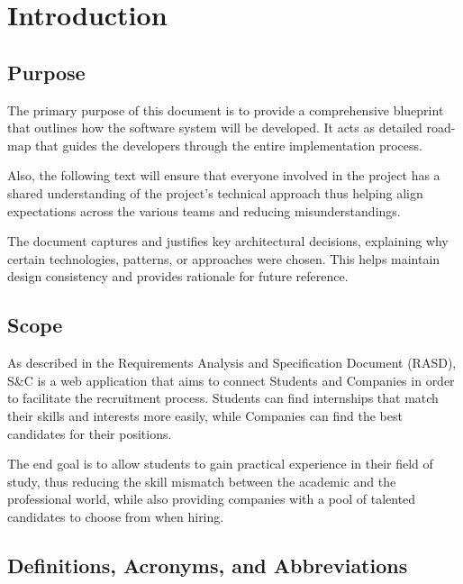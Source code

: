\chapter{Introduction}
\label{ch:Introduction}%

\section{Purpose}
\label{sec:Purpose}%

\par The primary purpose of this document is to provide a comprehensive blueprint that outlines how the software system
will be developed. It acts as detailed road-map that guides the developers through the entire implementation process.

\par Also, the following text will ensure that everyone involved in the project has a shared understanding of the
project's technical approach thus helping align expectations across the various teams and reducing misunderstandings.

\par The document captures and justifies key architectural decisions, explaining why certain technologies, patterns, or
approaches were chosen. This helps maintain design consistency and provides rationale for future reference.

\section{Scope}
\label{sec:Scope}%

\par As described in the Requirements Analysis and Specification Document (RASD), S\&C is a web application that aims
to connect Students and Companies in order to facilitate the recruitment process. Students can find internships that
match their skills and interests more easily, while Companies can find the best candidates for their positions.

\par The end goal is to allow students to gain practical experience in their field of study, thus reducing the skill
mismatch between the academic and the professional world, while also providing companies with a pool of talented
candidates to choose from when hiring.

\section{Definitions, Acronyms, and Abbreviations}
\label{sec:definitions-acronyms-abbreviations}%

